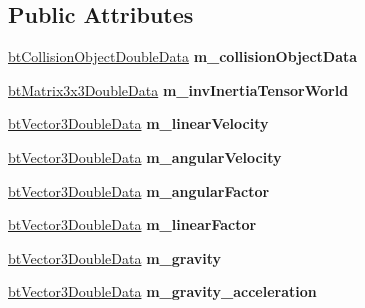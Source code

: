 \subsection*{Public Attributes}
\begin{DoxyCompactItemize}
\item 
\mbox{\label{structbtRigidBodyDoubleData_a1c4fa0f6a475e512e31fcc169b678d0d}} 
\hyperlink{structbtCollisionObjectDoubleData}{bt\+Collision\+Object\+Double\+Data} {\bfseries m\+\_\+collision\+Object\+Data}
\item 
\mbox{\label{structbtRigidBodyDoubleData_a6d703fbb528e22014b2ad8db6d0e1369}} 
\hyperlink{structbtMatrix3x3DoubleData}{bt\+Matrix3x3\+Double\+Data} {\bfseries m\+\_\+inv\+Inertia\+Tensor\+World}
\item 
\mbox{\label{structbtRigidBodyDoubleData_a952a5aa9784c576e6ad2e9ebf35fd3d3}} 
\hyperlink{structbtVector3DoubleData}{bt\+Vector3\+Double\+Data} {\bfseries m\+\_\+linear\+Velocity}
\item 
\mbox{\label{structbtRigidBodyDoubleData_a01c0d935103cadba8cd97de9417b9747}} 
\hyperlink{structbtVector3DoubleData}{bt\+Vector3\+Double\+Data} {\bfseries m\+\_\+angular\+Velocity}
\item 
\mbox{\label{structbtRigidBodyDoubleData_a655d9ba7e90acf26350fa05be8e604e1}} 
\hyperlink{structbtVector3DoubleData}{bt\+Vector3\+Double\+Data} {\bfseries m\+\_\+angular\+Factor}
\item 
\mbox{\label{structbtRigidBodyDoubleData_a3c97a6496719e7e41a3fe9426ca401eb}} 
\hyperlink{structbtVector3DoubleData}{bt\+Vector3\+Double\+Data} {\bfseries m\+\_\+linear\+Factor}
\item 
\mbox{\label{structbtRigidBodyDoubleData_ab3374b6583f0250a0123f4ab328877a4}} 
\hyperlink{structbtVector3DoubleData}{bt\+Vector3\+Double\+Data} {\bfseries m\+\_\+gravity}
\item 
\mbox{\label{structbtRigidBodyDoubleData_aebe6fef2407ec74b7742bdedfc91867f}} 
\hyperlink{structbtVector3DoubleData}{bt\+Vector3\+Double\+Data} {\bfseries m\+\_\+gravity\+\_\+acceleration}

\end{DoxyCompactItemize}
